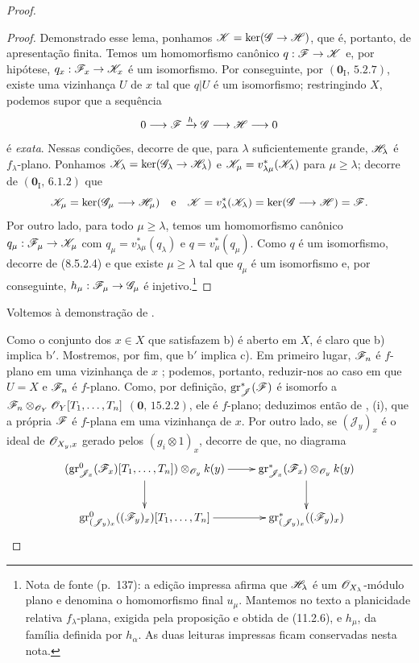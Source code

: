 \begin{proof}
\begin{proof}
Demonstrado esse lema, ponhamos
$\sh{K}=\ker(\sh{G}\to\sh{H})$, que é,
portanto, de apresentação finita. Temos um
homomorfismo canônico $q:\sh{F}\to\sh{K}$
e, por hipótese,
$q_x:\sh{F}_x\to\sh{K}_x$ é um isomorfismo.
Por conseguinte, por
$(\mathbf 0_{\mathrm I},\,5.2.7)$, existe
uma vizinhança $U$ de $x$ tal que $q|U$
é um isomorfismo; restringindo $X$, podemos
supor que a sequência
\[
0\longrightarrow\mathscr{F}\xrightarrow{h}\mathscr{G}
\longrightarrow\mathscr{H}\longrightarrow0
\]
é \emph{exata}. Nessas condições, decorre de
 que, para $\lambda$
suficientemente grande, $\mathscr{H}_\lambda$
é $f_\lambda$-plano. Ponhamos
$\sh{K}_\lambda=\ker(\sh{G}_\lambda
\to\sh{H}_\lambda)$ e
$\mathscr{K}_\mu=v_{\lambda\mu}^*
(\mathscr{K}_\lambda)$ para $\mu\geq\lambda$;
decorre de $(\mathbf 0_{\mathrm I},\,6.1.2)$
que
\[
\sh{K}_\mu=\ker(\sh{G}_\mu\to\sh{H}_\mu)
\quad\text{e}\quad
\sh{K}=v_\lambda^*(\sh{K}_\lambda)
=\ker(\sh{G}\to\sh{H})=\sh{F}.
\]
Por outro lado, para todo $\mu\geq\lambda$,
temos um homomorfismo canônico
$q_\mu:\sh{F}_\mu\to\sh{K}_\mu$ com
$q_\mu=v_{\lambda\mu}^*(q_\lambda)$ e
$q=v_\mu^*(q_\mu)$. Como $q$ é um
isomorfismo, decorre de (8.5.2.4) e
 que existe
$\mu\geq\lambda$ tal que $q_\mu$ é um
isomorfismo e, por conseguinte,
$h_\mu:\sh{F}_\mu\to\sh{G}_\mu$
é injetivo.\footnote{Nota de fonte (p.~137): a edição impressa afirma que $\mathscr{H}_\lambda$ é um $\mathscr{O}_{X_\lambda}$-módulo plano e denomina o homomorfismo final $u_\mu$. Mantemos no texto a planicidade relativa $f_\lambda$-plana, exigida pela proposição e obtida de (11.2.6), e $h_\mu$, da família definida por $h_\alpha$. As duas leituras impressas ficam conservadas nesta nota.}
\end{proof}

Voltemos à demonstração de .

Como o conjunto dos $x\in X$ que satisfazem b)
é aberto em $X$, é claro que b) implica b$'$.
Mostremos, por fim, que b$'$ implica c).
Em primeiro lugar, $\mathscr{F}_n$ é $f$-plano
em uma vizinhança de $x$ ;
podemos, portanto, reduzir-nos ao caso em que
$U=X$ e $\mathscr{F}_n$ é $f$-plano. Como, por
definição, $\operatorname{gr}_{\mathscr J}^*
(\mathscr{F})$ é isomorfo a
$\mathscr{F}_n\otimes_{\mathscr{O}_Y}
\mathscr{O}_Y[T_1,\ldots,T_n]$
$(\mathbf 0,\,15.2.2)$, ele é $f$-plano;
deduzimos então de , (i),
que a própria $\mathscr{F}$ é $f$-plana em uma
vizinhança de $x$. Por outro lado, se
$(\mathcal J_y)_x$ é o ideal de
$\mathscr{O}_{X_y,x}$ gerado pelos
$(g_i\otimes1)_x$, decorre de
 que, no diagrama
\[
\xymatrix{
(\operatorname{gr}_{\mathcal J_x}^0(\sh{F}_x)
 [T_1,\ldots,T_n])\otimes_{\sh{O}_y}k(y)
 \ar[r]\ar[d] &
\operatorname{gr}_{\mathcal J_x}^*(\sh{F}_x)
 \otimes_{\sh{O}_y}k(y)\ar[d]\\
\operatorname{gr}_{(\mathcal J_y)_x}^0
 ((\sh{F}_y)_x)[T_1,\ldots,T_n]\ar[r] &
\operatorname{gr}_{(\mathcal J_y)_x}^*
 ((\sh{F}_y)_x)
}
\]


\end{proof}
